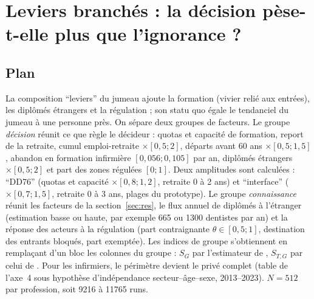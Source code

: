\documentclass[11pt]{article}
\begin{document}
\section{Leviers branchés : la décision pèse-t-elle plus que l'ignorance ?}\label{sec:lev}
\subsection{Plan}
La composition \enquote{leviers} du jumeau ajoute la formation (vivier relié aux entrées), les diplômés étrangers et
la régulation ; son statu quo égale le tendanciel du jumeau à une personne près\mesure{}. On sépare deux groupes de
facteurs. Le groupe \emph{décision} réunit ce que règle le décideur : quotas et capacité de formation, report de la
retraite, cumul emploi-retraite $\times[0{,}5 ; 2]$, départs avant 60 ans $\times[0{,}5 ; 1{,}5]$, abandon en
formation infirmière $[0{,}056 ; 0{,}105]$ par an\derive{}, diplômés étrangers $\times[0{,}5 ; 2]$ et part des zones
régulées $[0 ; 1]$. Deux amplitudes sont calculées : \enquote{DD76} (quotas et capacité $\times[0{,}8 ; 1{,}2]$,
retraite 0 à 2 ans) et \enquote{interface} ($\times[0{,}7 ; 1{,}5]$, retraite 0 à 3 ans, plages du prototype). Le
groupe \emph{connaissance} réunit les facteurs de la section~\ref{sec:res}, le flux annuel de diplômés à l'étranger
(estimation basse ou haute, par exemple 665 ou \num{1300} dentistes par an\derive{}) et la réponse des acteurs à la
régulation (part contraignante $\theta \in [0{,}5 ; 1]$\suppose{}, destination des entrants bloqués, part exemptée).
Les indices de groupe s'obtiennent en remplaçant d'un bloc les colonnes du groupe : $S_G$ par l'estimateur de
\citet{saltelli2010}, $S_{T,G}$ par celui de \citet{jansen1999}. Pour les infirmiers, le périmètre devient le privé
complet (table de l'axe~4 sous hypothèse d'indépendance secteur--âge--sexe, 2013--2023). $N = 512$ par profession,
soit \num{9216} à \num{11765}\mesure{} runs.
\end{document}
